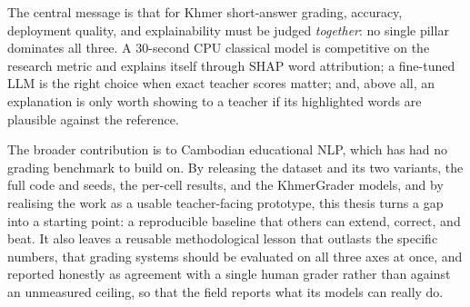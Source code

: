The central message is that for Khmer short-answer grading, accuracy, deployment quality, and
explainability must be judged \emph{together}: no single pillar dominates all three. A 30-second CPU
classical model is competitive on the research metric and explains itself through SHAP word
attribution; a fine-tuned LLM is the right choice when exact teacher scores matter; and, above all, an
explanation is only worth showing to a teacher if its highlighted words are plausible against the reference.

The broader contribution is to Cambodian educational NLP, which has had no grading benchmark to build on.
By releasing the dataset and its two variants, the full code and seeds, the per-cell results, and the
KhmerGrader models, and by realising the work as a usable teacher-facing prototype, this thesis turns a
gap into a starting point: a reproducible baseline that others can extend, correct, and beat. It also
leaves a reusable methodological lesson that outlasts the specific numbers, that grading systems should
be evaluated on all three axes at once, and reported honestly as agreement with a single human grader
rather than against an unmeasured ceiling, so that the field reports what its models can really do.
